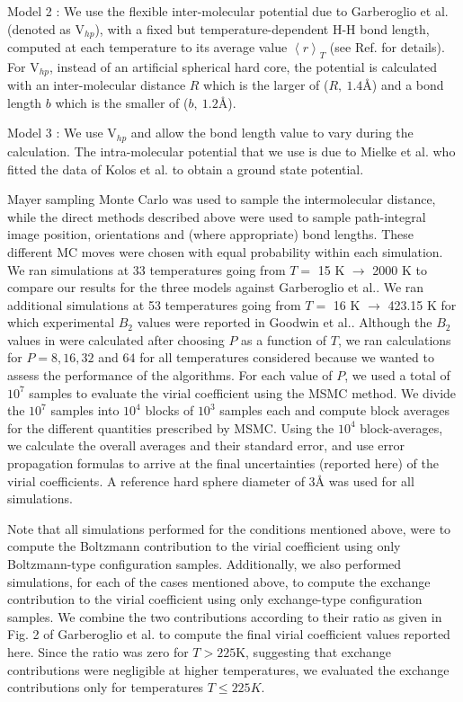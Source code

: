         Model 2 : We use the flexible inter-molecular potential due to Garberoglio et al.\cite{Garberoglio2012} (denoted as V$_{hp}$), with a fixed but temperature-dependent H-H bond length, computed at each temperature to its average value $\left< r \right>_T$ (see Ref. \cite{Garberoglio2012} for details). For V$_{hp}$, instead of an artificial spherical hard core, the potential is calculated with an inter-molecular distance $R$ which is the larger of ($R,\: 1.4${\AA}) and a bond length $b$ which is the smaller of ($b,\: 1.2${\AA}).

        Model 3 : We use V$_{hp}$ and allow the bond length value to vary during the calculation. The intra-molecular potential that we use is due to Mielke et al.\cite{Mielke2002} who fitted the data of Kolos et al.\cite{Kolos1986} to obtain a ground state potential. 
        
        Mayer sampling Monte Carlo was used to sample the intermolecular distance, while the direct methods described above were used to sample path-integral image position, orientations and (where appropriate) bond lengths. These different MC moves were chosen with equal probability within each simulation. We ran simulations at 33 temperatures going from $T =$ 15 K $\to$ 2000 K to compare our results for the three models against Garberoglio et al.\cite{Garberoglio2014}. We ran additional simulations at 53 temperatures going from $T =$ 16 K $\to$ 423.15 K for which experimental $B_2$ values were reported in Goodwin et al.\cite{Goodwin1963}. Although the $B_2$ values in \cite{Garberoglio2014} were calculated after choosing $P$ as a function of $T$, we ran calculations for $P = 8, 16, 32$ and $64$ for all temperatures considered because we wanted to assess the performance of the algorithms. For each value of $P$, we used a total of $10^7$ samples to evaluate the virial coefficient using the MSMC\cite{Singh2004} method. We divide the $10^7$ samples into $10^4$ blocks of $10^3$ samples each and compute block averages for the different quantities prescribed by MSMC. Using the $10^4$ block-averages, we calculate the overall averages and their standard error, and use error propagation formulas to arrive at the final uncertainties (reported here) of the virial coefficients. A reference hard sphere diameter of 3{\AA} was used for all simulations.
        
        Note that all simulations performed for the conditions mentioned above, were to compute the Boltzmann contribution to the virial coefficient using only Boltzmann-type configuration samples. Additionally, we also performed simulations, for each of the cases mentioned above, to compute the exchange contribution to the virial coefficient using only exchange-type configuration samples. We combine the two contributions according to their ratio as given in Fig. 2 of Garberoglio et al. \cite{Garberoglio2014} to compute the final virial coefficient values reported here. Since the ratio was zero for $T > 225$K, suggesting that exchange contributions were negligible at higher temperatures, we evaluated the exchange contributions only for temperatures $T \le 225K$. 

